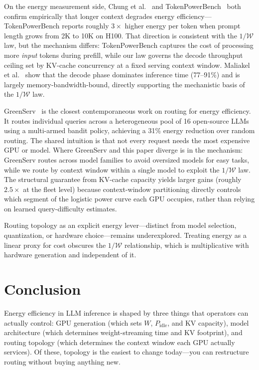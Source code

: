 \documentclass[11pt,a4paper]{article}
\newcommand{\Pidle}{P_{\text{idle}}}
\begin{document}
On the energy measurement side, Chung et al.~\citep{chung2026mlenergy} and
TokenPowerBench~\citep{niu2025tokenpowerbench} both confirm empirically that
longer context degrades energy efficiency---TokenPowerBench reports roughly
$3\times$ higher energy per token when prompt length grows from 2K to 10K on
H100.  That direction is consistent with the $1/\mathcal{W}$ law, but the
mechanism differs: TokenPowerBench captures the cost of processing more
\emph{input} tokens during prefill, while our law governs the decode throughput
ceiling set by KV-cache concurrency at a fixed serving context window.
Maliakel et al.~\citep{maliakel2025dvfs} show that the decode phase dominates
inference time (77--91\%) and is largely memory-bandwidth-bound, directly
supporting the mechanistic basis of the $1/\mathcal{W}$ law.

GreenServ~\citep{ziller2026greenserv} is the closest contemporaneous work on
routing for energy efficiency.  It routes individual queries across a
heterogeneous pool of 16 open-source LLMs using a multi-armed bandit policy,
achieving a 31\% energy reduction over random routing.  The shared intuition is
that not every request needs the most expensive GPU or model.  Where GreenServ
and this paper diverge is in the mechanism: GreenServ routes across model
families to avoid oversized models for easy tasks, while we route by context
window within a single model to exploit the $1/\mathcal{W}$ law.  The
structural guarantee from KV-cache capacity yields larger gains (roughly
$2.5\times$ at the fleet level) because context-window partitioning directly
controls which segment of the logistic power curve each GPU occupies, rather
than relying on learned query-difficulty estimates.

Routing topology as an explicit energy lever---distinct from model selection,
quantization, or hardware choice---remains underexplored.  Treating energy as
a linear proxy for cost obscures the $1/\mathcal{W}$ relationship, which is
multiplicative with hardware generation and independent of it.

\section{Conclusion}
\label{sec:conclusion}

Energy efficiency in LLM inference is shaped by three things that operators
can actually control: GPU generation (which sets $W$, $\Pidle$, and KV
capacity), model architecture (which determines weight-streaming time and KV
footprint), and routing topology (which determines the context window each GPU
actually services).  Of these, topology is the easiest to change today---you
can restructure routing without buying anything new.
\end{document}
